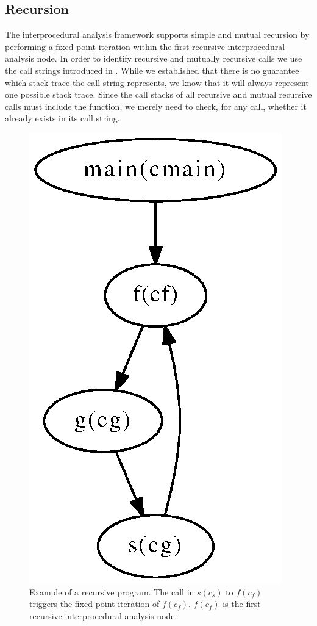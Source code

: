 \subsection{Recursion}

The interprocedural analysis framework supports simple and mutual
recursion by performing a fixed point iteration within the first
recursive interprocedural analysis node. In order to identify
recursive and mutually recursive calls we use the call strings
introduced in . While we established that
there is no guarantee which stack trace the call string represents,
we know that it will always represent one possible stack trace.
Since the call stacks of all recursive and mutual recursive calls must
include the function, we merely need to check, for any call,
whether it already exists in its call string.

\begin{figure}[htbp]
\begin{center}
\includegraphics[scale=.6]{Figures/recursive.eps}
\caption[A recursive example]{
Example of a recursive program. The call in $s(c_s)$
to $f(c_f)$ triggers the fixed point iteration of $f(c_f)$. 
$f(c_f)$ is the first recursive interprocedural
analysis node.
}
\label{Fig:recursive}
\end{center}
\end{figure}


